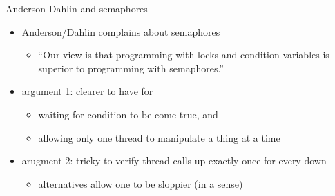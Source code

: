 \begin{frame}{Anderson-Dahlin and semaphores}
    \begin{itemize}
    \item Anderson/Dahlin complains about semaphores
        \begin{itemize}
        \item ``Our view is that programming with locks and condition variables is superior to programming
                with semaphores.''
        \end{itemize}
    \item argument 1: clearer to have  for
            \begin{itemize}
            \item waiting for condition to be come true, and
            \item allowing only one thread to manipulate a thing at a time
            \end{itemize}
    \item arugment 2: tricky to verify thread calls up exactly once for every down
            \begin{itemize}
                \item alternatives allow one to be sloppier (in a sense)
            \end{itemize}
    \end{itemize}
\end{frame}

